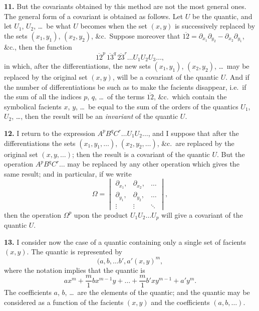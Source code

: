 \documentclass[11pt,a4paper]{book}
\begin{document}
\newpage
\setcounter{page}{227}

\textbf{11.} But the covariants obtained by this method are not the most general ones. The general form of a covariant is obtained as follows. Let $U$ be the quantic, and let $U_1$, $U_2$, \ldots\ be what $U$ becomes when the set $(x, y)$ is successively replaced by the sets $(x_1, y_1)$, $(x_2, y_2)$, \&c.\ Suppose moreover that $\overline{12} = \partial_{x_1}\partial_{y_2} - \partial_{x_2}\partial_{y_1}$, \&c., then the function
\[
\overline{12}^p \, \overline{13}^q \, \overline{23}^r \ldots U_1 U_2 U_3 \ldots,
\]
in which, after the differentiations, the new sets $(x_1, y_1)$, $(x_2, y_2)$, \ldots\ may be replaced by the original set $(x, y)$, will be a covariant of the quantic $U$. And if the number of differentiations be such as to make the facients disappear, i.e.\ if the sum of all the indices $p$, $q$, \ldots\ of the terms $\overline{12}$, \&c.\ which contain the symbolical facients $x$, $y$, \ldots\ be equal to the sum of the orders of the quantics $U_1$, $U_2$, \ldots, then the result will be an \textit{invariant} of the quantic $U$.

\textbf{12.} I return to the expression $A^p B^q C^r \ldots U_1 U_2 \ldots$, and I suppose that after the differentiations the sets $(x_1, y_1, \ldots)$, $(x_2, y_2, \ldots)$, \&c.\ are replaced by the original set $(x, y, \ldots)$; then the result is a covariant of the quantic $U$. But the operation $A^p B^q C^r \ldots$ may be replaced by any other operation which gives the same result; and in particular, if we write
\[
\Omega = \begin{vmatrix}
\partial_{x_1}, & \partial_{x_2}, & \ldots \\
\partial_{y_1}, & \partial_{y_2}, & \ldots \\
\vdots & \vdots & \ddots
\end{vmatrix},
\]
then the operation $\Omega^p$ upon the product $U_1 U_2 \ldots U_p$ will give a covariant of the quantic $U$.

\newpage
\setcounter{page}{228}

\textbf{13.} I consider now the case of a quantic containing only a single set of facients $(x, y)$. The quantic is represented by
\[
(a, b, \ldots b', a' \!\!\!\!(x, y)^m,
\]
where the notation implies that the quantic is
\[
ax^m + \frac{m}{1} bx^{m-1}y + \ldots + \frac{m}{1} b'xy^{m-1} + a'y^m.
\]
The coefficients $a$, $b$, \ldots\ are the elements of the quantic; and the quantic may be considered as a function of the facients $(x, y)$ and the coefficients $(a, b, \ldots)$.
\end{document}
